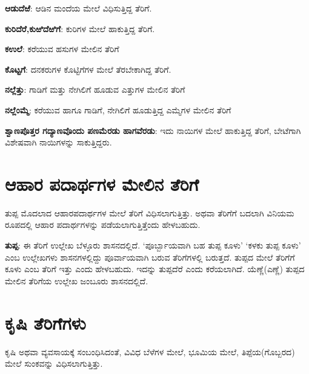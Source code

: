 \textbf{ಆಡುದೆಱೆ}: ಆಡಿನ ಮಂದೆಯ ಮೇಲೆ ವಿಧಿಸುತ್ತಿದ್ದ ತೆರಿಗೆ.

\textbf{ಕುರಿದೆರೆ,}\textbf{ಕುಱಿದೆಱಿಗೆ}: ಕುರಿಗಳ ಮೇಲೆ ಹಾಕುತ್ತಿದ್ದ ತೆರಿಗೆ.

\textbf{ಕಉಲೆ}: ಕರೆಯುವ ಹಸುಗಳ ಮೇಲಿನ ತೆರಿಗೆ

\textbf{ಕೊಟ್ಟಗೆ}: ದನಕರುಗಳ ಕೊಟ್ಟಿಗೆಗಳ ಮೇಲೆ ತೆರಬೇಕಾಗಿದ್ದ ತೆರಿಗೆ.

\textbf{ನಲ್ಲೆತ್ತು}: ಗಾಡಿಗೆ ಮತ್ತು ನೇಗಿಲಿಗೆ ಹೂಡುವ ಎತ್ತುಗಳ ಮೇಲಿನ ತೆರಿಗೆ

\textbf{ನಲ್ಲೆಂಮ್ಮೆ}: ಕರೆಯುವ ಹಾಗೂ ಗಾಡಿಗೆ, ನೇಗಿಲಿಗೆ ಹೂಡುತ್ತಿದ್ದ ಎಮ್ಮೆಗಳ ಮೇಲಿನ ತೆರಿಗೆ

\textbf{ಶ್ವಾಣಪೊತ್ತರ ಗದ್ಯಾಣವೊಂದು ಪಣಮೆರಡು ಹಾಗವೆರಡು}: ಇದು ನಾಯಿಗಳ ಮೇಲೆ ಹಾಕುತ್ತಿದ್ದ ತೆರಿಗೆ, ಬೇಟೆಗಾಗಿ ವಿಶೇಷವಾಗಿ ನಾಯಿಗಳನ್ನು ಸಾಕುತ್ತಿದ್ದರು.

\section{ಆಹಾರ ಪದಾರ್ಥಗಳ ಮೇಲಿನ ತೆರಿಗೆ}

ತುಪ್ಪ ಮೊದಲಾದ ಆಹಾರಪದಾರ್ಥಗಳ ಮೇಲೆ ತೆರಿಗೆ ವಿಧಿಸಲಾಗುತ್ತಿತ್ತು. ಅಥವಾ ತೆರಿಗೆಗೆ ಬದಲಾಗಿ ವಿನಿಯಮ ರೂಪದಲ್ಲಿ ಆಹಾರ ಪದಾರ್ಥಗಳನ್ನು ಪಡೆಯಲಾಗುತ್ತಿತ್ತೆಂದು ಹೇಳಬಹುದು.

\textbf{ತುಪ್ಪ}: ಈ ತೆರಿಗೆ ಉಲ್ಲೇಖ ಬೆಳ್ಳೂರು ಶಾಸನದಲ್ಲಿದೆ. ‘ಪೂರ್ಬ್ಬಾಯವಾಗಿ ಬಹ ತುಪ್ಪ ಕೂಳು’ ‘ಕಳಕು ತುಪ್ಪ ಕೂಳು’ ಎಂಬ ಉಲ್ಲೇಖಗಳು ಶಾಸನಗಳಲ್ಲಿದ್ದು ಪೂರ್ವಾಯವಾಗಿ ಬರುವ ತೆರಿಗೆಗಳಲ್ಲಿ ಬರುತ್ತದೆ. ತುಪ್ಪದ ಮೇಲೆ ತೆರಿಗೆಗೆ ಕೂಳು ಎಂಬ ತೆರಿಗೆ ಇತ್ತು ಎಂದು ಹೇಳಬಹುದು. ಇದನ್ನು ತುಪ್ಪದೆರೆ ಎಂದು ಕರೆಯಲಾಗಿದೆ. ಯೆಣ್ಣೆ(ಎಣ್ಣೆ) ತುಪ್ಪದ ಮೇಲಿನ ತೆರಿಗೆಯ ಉಲ್ಲೇಖ ಜಂಬೂರು ಶಾಸನದಲ್ಲಿದೆ.

\section{ಕೃಷಿ ತೆರಿಗೆಗಳು}

ಕೃಷಿ ಅಥವಾ ವ್ಯವಸಾಯಕ್ಕೆ ಸಂಬಂಧಿಸಿದಂತೆ, ವಿವಿಧ ಬೆಳೆಗಳ ಮೇಲೆ, ಭೂಮಿಯ ಮೇಲೆ, ತಿಪ್ಪೆಯ(ಗೊಬ್ಬರದ) ಮೇಲೆ ಸುಂಕವನ್ನು ವಿಧಿಸಲಾಗುತ್ತಿತ್ತು.


